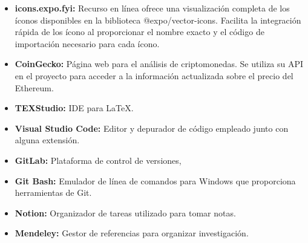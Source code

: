 \begin{itemize}

\item \textbf{icons.expo.fyi:} Recurso en línea ofrece una visualización completa de los íconos disponibles en la biblioteca @expo/vector-icons.
Facilita la integración rápida de los ícono al proporcionar el nombre exacto y el código de importación necesario para cada ícono.

\item \textbf{CoinGecko:} Página web para el análisis de criptomonedas. Se utiliza su API en el proyecto para acceder a la información actualizada sobre el precio del Ethereum. 

\item \textbf{TEXStudio:} IDE para LaTeX.

\item \textbf{Visual Studio Code:} Editor y depurador de código empleado junto con alguna extensión.

\item \textbf{GitLab:} Plataforma de control de versiones,

\item \textbf{Git Bash:} Emulador de línea de comandos para Windows que proporciona herramientas de Git.

\item \textbf{Notion:} Organizador de tareas utilizado para tomar notas.

\item \textbf{Mendeley:} Gestor de referencias para organizar investigación.

\end{itemize}











